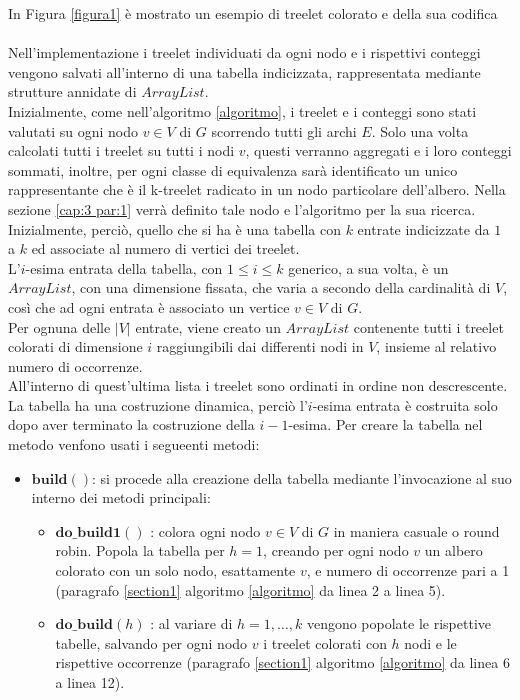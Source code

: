  In Figura \ref{figura1} \`e mostrato un esempio di treelet colorato e della sua codifica\\\\
Nell'implementazione i treelet individuati da ogni nodo e i rispettivi conteggi vengono salvati all'interno di una tabella indicizzata, rappresentata mediante strutture annidate di $ ArrayList $.\\
Inizialmente, come nell'algoritmo \ref{algoritmo}, i treelet e i conteggi sono stati valutati su ogni nodo $ v \in V $ di $ G $ scorrendo tutti gli archi $ E $.
Solo una volta calcolati  tutti i treelet su tutti i nodi $ v $, questi verranno aggregati e i loro conteggi sommati, inoltre, per ogni classe di equivalenza sar\`a identificato un unico rappresentante che \`e il k-treelet radicato in un nodo particolare dell'albero.
Nella sezione \ref{cap:3 par:1} verr\`a definito tale nodo e l'algoritmo per la sua ricerca.\\
Inizialmente, perci\`o, quello che si ha \`e una tabella con $ k $ entrate indicizzate da $ 1 $ a $ k $ ed associate al numero di vertici dei treelet.\\
L'$ i $-esima entrata della tabella, con $ 1\le i \le k $ generico, a sua volta, \`e un $ ArrayList $, con una dimensione fissata, che varia a secondo della cardinalit\`a di $ V $, cos\`i che ad ogni entrata \`e associato un vertice $ v\in V $ di $ G $.\\
Per ognuna delle $ |V| $ entrate, viene creato un $ ArrayList $ contenente tutti i treelet colorati di dimensione $ i $ raggiungibili dai differenti nodi in $ V $, insieme al relativo numero di occorrenze.\\
All'interno di quest'ultima lista i treelet sono ordinati in ordine non descrescente.\\
La tabella ha una costruzione dinamica, perci\`o l'$ i $-esima entrata \`e costruita solo dopo aver terminato la costruzione della $ i-1 $-esima.
Per creare la tabella nel metodo venfono usati i segueenti metodi:
\begin{itemize}
	\item $ \textbf{build}() $: si procede alla creazione della tabella mediante l'invocazione al suo interno dei metodi principali:
	\begin{itemize}
		\item $\textbf{do\_build1}()$ : colora ogni nodo $ v\in V $ di $ G $ in maniera casuale o round robin. Popola la tabella per $ h=1 $, creando per ogni nodo $ v $ un albero colorato con un solo nodo, esattamente $ v $, e numero di occorrenze pari a 1 (paragrafo \ref{section1} algoritmo \ref{algoritmo} da linea 2 a linea 5).
		\item  $\textbf{do\_build}(h)$ : al variare di $ h = 1,\dots,k $ vengono popolate le rispettive tabelle, salvando per ogni nodo $ v $ i treelet colorati con $ h $ nodi e le rispettive occorrenze (paragrafo \ref{section1} algoritmo \ref{algoritmo} da linea 6 a linea 12).	
	\end{itemize}
\end{itemize}\mbox{}\\
